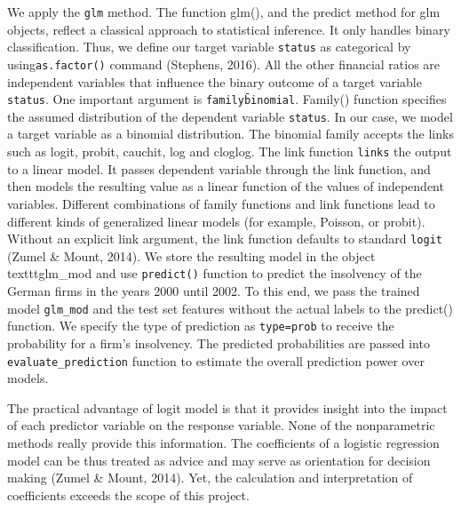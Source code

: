 \documentclass{article}
\begin{document}
We apply the \texttt{glm} method. The function glm(), and the predict method for glm objects, reflect a classical approach to statistical inference. It only handles binary classification. Thus, we define our target variable \texttt{status} as categorical by using\texttt{as.factor()} command (Stephens, 2016). All the other financial ratios are independent variables that influence the binary outcome of a target variable \texttt{status}. One important argument is \texttt{family\=binomial}. Family() function specifies the assumed distribution of the dependent variable \texttt{status}. In our case, we model a target variable as a binomial distribution. The binomial family accepts the links such as logit, probit, cauchit, log and cloglog. The link function \texttt{links} the output to a linear model. It passes dependent variable through the link function, and then models the resulting value as a linear function of the values of independent variables. Different combinations of family functions and link functions lead to different kinds of generalized linear models (for example, Poisson, or probit). Without an explicit link argument, the link function defaults to standard \texttt{logit} (Zumel \& Mount, 2014). We store the resulting model in the object texttt{glm\_mod} and use \texttt{predict()} function to predict the insolvency of the German firms in the years 2000 until 2002. To this end, we pass the trained model \texttt{glm\_mod} and the test set features without the actual labels to the predict() function. We specify the type of prediction as \texttt{type=prob} to receive the probability for a firm's insolvency. The predicted probabilities are passed into \texttt{evaluate\_prediction} function to estimate the overall prediction power over models.



The practical advantage of logit model is that it provides insight into the impact of each predictor variable on the response variable. None of the nonparametric methods really provide this information. The coefficients of a logistic regression model can be thus treated as advice and may serve as orientation for decision making (Zumel \& Mount, 2014). Yet, the calculation and interpretation of coefficients exceeds the scope of this project. 
\end{document}
